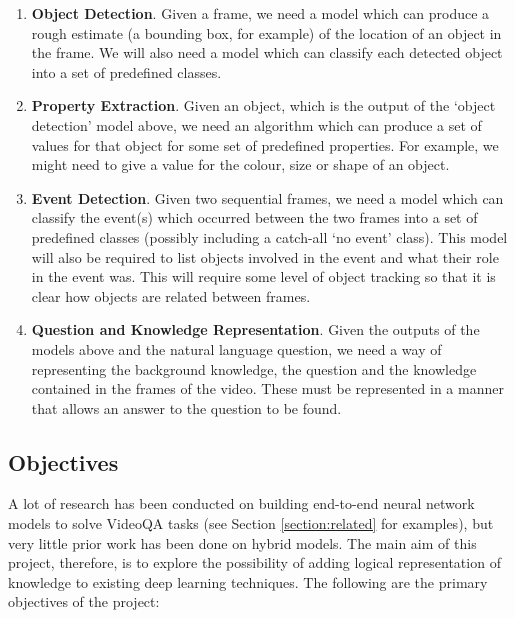 \begin{enumerate}
  \item \textbf{Object Detection}. Given a frame, we need a model which can produce a rough estimate (a bounding box, for example) of the location of an object in the frame. We will also need a model which can classify each detected object into a set of predefined classes.

  \item \textbf{Property Extraction}. Given an object, which is the output of the `object detection' model above, we need an algorithm which can produce a set of values for that object for some set of predefined properties. For example, we might need to give a value for the colour, size or shape of an object.

  \item \textbf{Event Detection}. Given two sequential frames, we need a model which can classify the event(s) which occurred between the two frames into a set of predefined classes (possibly including a catch-all `no event' class). This model will also be required to list objects involved in the event and what their role in the event was. This will require some level of object tracking so that it is clear how objects are related between frames.

  \item \textbf{Question and Knowledge Representation}. Given the outputs of the models above and the natural language question, we need a way of representing the background knowledge, the question and the knowledge contained in the frames of the video. These must be represented in a manner that allows an answer to the question to be found.
\end{enumerate}


\subsection{Objectives}

A lot of research has been conducted on building end-to-end neural network models to solve VideoQA tasks (see Section \ref{section:related} for examples), but very little prior work has been done on hybrid models. The main aim of this project, therefore, is to explore the possibility of adding logical representation of knowledge to existing deep learning techniques. The following are the primary objectives of the project:

